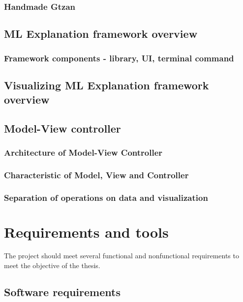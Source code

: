 \documentclass[
    bindingoffset=5mm,  %
    footnoteindent=3mm, %
    hyphenation=true    %
]{src/wut-thesis}
\begin{document}
\subsubsection{Handmade Gtzan}

\subsection{ML Explanation framework overview}
\subsubsection{Framework components - library, UI, terminal command}

\subsection{Visualizing ML Explanation framework overview}

\subsection{Model-View controller}
\subsubsection{Architecture of Model-View Controller}
\subsubsection{Characteristic of Model, View and Controller}
\subsubsection{Separation of operations on data and visualization}

%
%
\clearpage %
\section{Requirements and tools} \label{ch:reqrTools}

        The project should meet several functional and nonfunctional
        requirements to meet the objective of the thesis.

\subsection{Software requirements}
\end{document}

